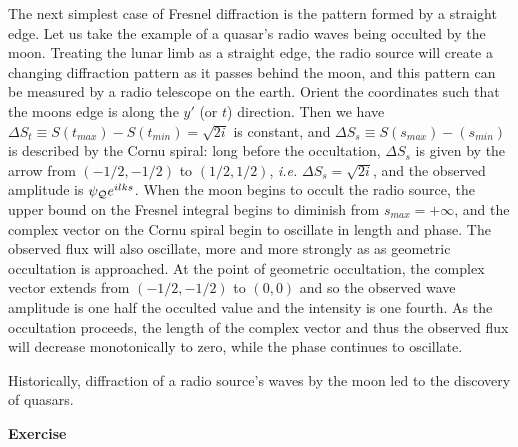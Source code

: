 \documentclass{article}
\begin{document}
The next simplest case of Fresnel diffraction is the pattern formed by a straight 
edge. Let us take the example of a quasar's radio waves being occulted by the 
moon.
Treating the lunar limb as a straight edge, the radio source will create
a changing diffraction pattern as it passes behind the moon, and this pattern
can be measured by a radio telescope on the earth. Orient the coordinates
such that the moons edge is along the $y'$ (or $t$) direction. Then we have
$\Delta S_t\equiv S(t_{max})-S(t_{min})=\sqrt{2i}$ is constant, and 
$\Delta S_s\equiv S(s_{max})-(s_{min})$ is described by the Cornu spiral: long
before the occultation, $\Delta S_s$ is given by the arrow from $(-{1/2},-{1/2})$
to $({1/2},{1/2})$, {\it i.e.} $\Delta S_s=\sqrt{2i}$, and the observed amplitude
is $\psi_{\cal{Q}}e^{ilks}$. When the moon begins to occult the radio source, the
upper bound on the Fresnel integral begins to diminish from $s_{max}=+\infty$, 
and the complex vector on the Cornu spiral begin to oscillate in length and 
phase. The observed flux will also oscillate, more and more strongly as as 
geometric occultation is approached. At the point of geometric occultation, the
complex vector extends from $(-{1/2},-{1/2})$ to $(0,0)$ and so the observed
wave amplitude is one half the occulted value and the intensity is one fourth. 
As the occultation proceeds, the length of the complex vector and thus the 
observed flux will decrease monotonically to zero, while the phase continues to
oscillate.

Historically, diffraction of a radio source's waves by the moon led to the 
discovery of quasars. 

{\bf Exercise}
\end{document}
